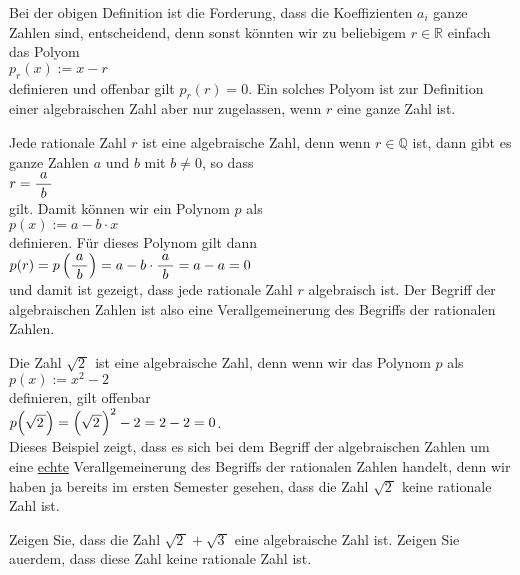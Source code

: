 Bei der obigen Definition ist die Forderung, dass die Koeffizienten $a_i$ ganze Zahlen sind, entscheidend,
denn sonst k\"onnten wir zu beliebigem $r \in \mathbb{R}$ einfach das Polyom
\\[0.2cm]
\hspace*{1.3cm}
$p_r(x) := x - r$
\\[0.2cm]
definieren und offenbar gilt $p_r(r) = 0$.  Ein solches Polyom ist zur Definition einer algebraischen
Zahl aber nur zugelassen, wenn $r$ eine ganze Zahl ist. \eod

\example
Jede rationale Zahl $r$ ist eine algebraische Zahl, denn wenn $r \in \mathbb{Q}$ ist, dann gibt es
ganze Zahlen $a$ und $b$ mit $b \not= 0$, so dass
\\[0.2cm]
\hspace*{1.3cm}
$r = \displaystyle\frac{\;\displaystyle a\;}{\;\displaystyle b\;}$
\\[0.2cm]
gilt.  Damit k\"onnen wir ein Polynom $p$ als
\\[0.2cm]
\hspace*{1.3cm}
$p(x) := a - b \cdot x$
\\[0.2cm]
definieren.  F\"ur dieses Polynom gilt dann
\\[0.2cm]
\hspace*{1.3cm}
$p(r) = p\left(\displaystyle\frac{\;\displaystyle a\;}{\;\displaystyle b\;}\right) = a - b \cdot \displaystyle\frac{\;\displaystyle a\;}{\;\displaystyle b\;} = a - a = 0$
\\[0.2cm]
und damit ist gezeigt, dass jede rationale Zahl $r$ algebraisch ist.  Der Begriff der algebraischen
Zahlen ist also eine Verallgemeinerung des Begriffs der rationalen Zahlen.  \eod

\example
Die Zahl $\sqrt{2\,}$ ist eine algebraische Zahl, denn wenn wir das Polynom $p$ als
\\[0.2cm]
\hspace*{1.3cm}
$p(x) := x^2 - 2$
\\[0.2cm]
definieren, gilt offenbar
\\[0.2cm]
\hspace*{1.3cm}
$p\Bigl(\sqrt{2\,}\Bigr) = \Bigl(\sqrt{2\,}\Bigr)^2 - 2 = 2 - 2 = 0$.  
\\[0.2cm]
Dieses Beispiel zeigt, dass es sich bei dem Begriff der algebraischen Zahlen um eine \underline{echte} 
Verallgemeinerung des Begriffs der rationalen Zahlen handelt, denn wir haben ja bereits im ersten
Semester gesehen, dass die Zahl $\sqrt{2\,}$ keine rationale Zahl ist.
\eod

\exercises
Zeigen Sie, dass die Zahl $\sqrt{2\,} + \sqrt{3\,}$ eine algebraische Zahl ist.  Zeigen Sie au\3erdem,
dass diese Zahl keine rationale Zahl ist.  \eox

